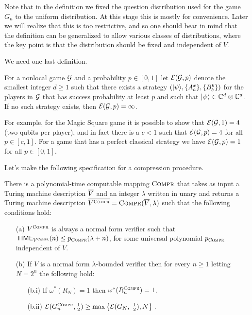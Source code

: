 Note that in the definition we fixed the question distribution used for the game $G_n$ to the uniform distribution. At this stage this is mostly for convenience. Later we will realize that this is too restrictive, and so one should bear in mind that the definition can be generalized to allow various classes of distributions, where the key point is that the distribution should be fixed and independent of $V$. 

We need one last definition.

\begin{definition}
For a nonlocal game $\mathcal{G}$ and a probability $p\in[0,1]$ let $\mathcal{E}(\mathcal{G},p)$ denote the smallest integer $d\geq 1$ such that there exists a strategy $(|\psi\rangle,\{A^x_a\},\{B^y_b\})$ for the players in $\mathcal{G}$ that has success probability at least $p$ and such that $|\psi\rangle \in \mathbb{C}^d \otimes \mathbb{C}^d$. If no such strategy exists, then $\mathcal{E}(\mathcal{G},p) = \infty$. 
\end{definition}

For example, for the Magic Square game it is possible to show that $\mathcal{E}(\mathcal{G},1)=4$ (two qubits per player), and in fact there is a $c<1$ such that $\mathcal{E}(\mathcal{G},p)=4$ for all $p\in[c,1]$. For a game that has a perfect classical strategy we have $\mathcal{E}(\mathcal{G},p)=1$ for all $p\in[0,1]$. 

Let's make the following specification for a compression procedure. 

\begin{claim}\label{claim:compression}
There is a polynomial-time computable mapping $\textsc{Compr}$ that takes as input a Turing machine description $\overline{V}$ and an integer $\lambda$ written in unary and returns a Turing machine description $\overline{V^{\textsc{Compr}}} = \textsc{Compr}(\overline{V},\lambda)$ such that the following conditions hold: 
\begin{itemize}
\item[(a)] $V^{\textsc{Compr}}$ is always a normal form verifier such that $\mathsf{TIME}_{V^{\textsc{Compr}}}(n) \leq p_{\textsc{Compr}}(\lambda + n)$, for some universal polynomial $p_{\textsc{Compr}}$ independent of $V$.
\item[(b)] If $V$ is a normal form $\lambda$-bounded verifier then for every $n\geq 1$ letting $N=2^n$ the following hold:
\begin{itemize}
\item[(b.i)] If $\omega^*(R_N)=1$ then $\omega^*(R^{\textsc{Compr}}_n)=1$. 
\item[(b.ii)] $\mathcal{E}(G^{\textsc{Compr}}_n,\frac{1}{2}) \geq \max\big\{\mathcal{E}(G_N,\;\frac{1}{2}),N\big\}\;.$
\end{itemize}
\end{itemize}
\end{claim}

